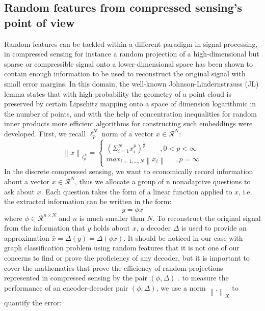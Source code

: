 \subsection{Random features from compressed sensing's  point of view}
Random features can be tackled within a different paradigm in signal processing, in compressed sensing for instance a random projection of a high-dimensional but sparse or compressible signal onto a lower-dimensional space has been shown to contain enough information to be used to reconstruct the original signal with small error margins. In this domain, the well-known Johnson-Lindernstrauss (JL) lemma states that with high probability the geometry of a point cloud is preserved by certain Lipschitz mapping onto a space of dimension logarithmic in the number of points, and with the help of concentration inequalities for random inner products more efficient algorithms for constructing such embeddings were developed. First, we recall $\ell_p^N$ norm of a vector $x\in\mathcal{R}^N$:
\begin{equation}
    \left \| x\right\|_{\ell_p^N}=
    \left\{\begin{matrix}
{(\Sigma_{i=1}^N x_i^p)}^\frac{1}{p}\qquad,  0<p<\infty\\ 
max_{i=1,...,N}\left \| x_i\right\|~~\quad, p=\infty
\end{matrix}\right.
\end{equation}
In the discrete compressed sensing, we want to economically record information about a vector $x\in \mathcal{R}^N$, thus we allocate a group of n nonadaptive questions to ask about $x$. Each question takes the form of a linear function applied to $x$, i.e. the extracted information can be written in the form: 
\begin{equation}
    y=\phi x
\end{equation}
where $\phi \in \mathcal{R}^{n\times N}$ and $n$ is much smaller than $N$. \newline
To reconstruct the original signal from the information that $y$ holds about $x$, a decoder $\Delta$ is used to provide an approximation $\bar{x}=\Delta(y)=\Delta(\phi x)$. It should be noticed in our case with graph classification problem using random features that it is not one of our concerns to find or prove the proficiency of any decoder, but it is important to cover the mathematics that prove the efficiency of random projections represented in compressed sensing by the pair $(\phi, \Delta)$ . to measure the performance of an encoder-decoder pair $(\phi, \Delta)$, we use a norm $\left\| .\right\|_X$ to quantify the error: 
